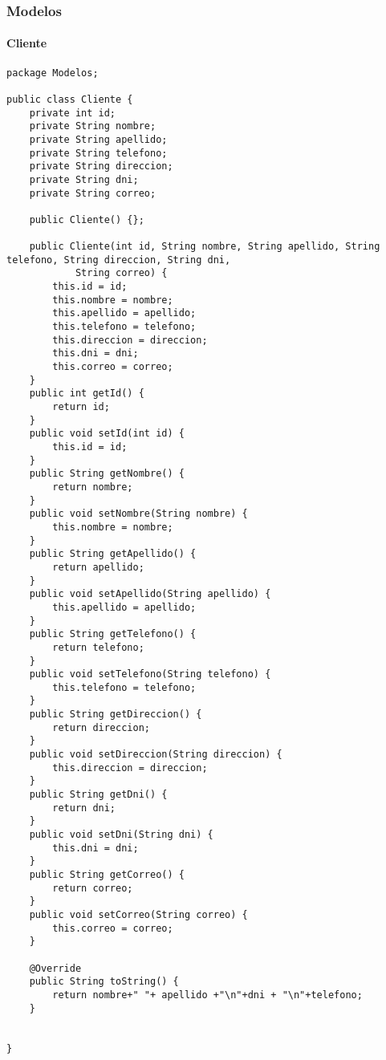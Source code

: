 \documentclass{article}
\begin{document}
\subsubsection{Modelos}
\paragraph{Cliente}
\begin{lstlisting}
package Modelos;

public class Cliente {
	private int id;
	private String nombre;
	private String apellido;
	private String telefono;
	private String direccion;
	private String dni;
	private String correo;
	
	public Cliente() {};
	
	public Cliente(int id, String nombre, String apellido, String telefono, String direccion, String dni,
			String correo) {
		this.id = id;
		this.nombre = nombre;
		this.apellido = apellido;
		this.telefono = telefono;
		this.direccion = direccion;
		this.dni = dni;
		this.correo = correo;
	}
	public int getId() {
		return id;
	}
	public void setId(int id) {
		this.id = id;
	}
	public String getNombre() {
		return nombre;
	}
	public void setNombre(String nombre) {
		this.nombre = nombre;
	}
	public String getApellido() {
		return apellido;
	}
	public void setApellido(String apellido) {
		this.apellido = apellido;
	}
	public String getTelefono() {
		return telefono;
	}
	public void setTelefono(String telefono) {
		this.telefono = telefono;
	}
	public String getDireccion() {
		return direccion;
	}
	public void setDireccion(String direccion) {
		this.direccion = direccion;
	}
	public String getDni() {
		return dni;
	}
	public void setDni(String dni) {
		this.dni = dni;
	}
	public String getCorreo() {
		return correo;
	}
	public void setCorreo(String correo) {
		this.correo = correo;
	}
	
	@Override
	public String toString() {
		return nombre+" "+ apellido +"\n"+dni + "\n"+telefono;
	}
	
	
}
\end{lstlisting}
\clearpage
\end{document}
